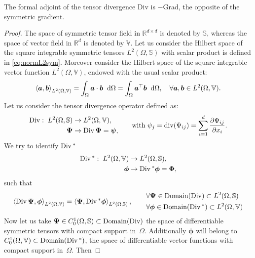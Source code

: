 \begin{theorem}\label{th:adjDiv}
	The formal adjoint of the tensor divergence $\mathrm{Div}$ is $- \mathrm{Grad}$, the opposite of the symmetric gradient.
	\begin{proof}
		The space of symmetric tensor field in $\mathbb{R}^{d\times d}$ is denoted by $\mathbb{S}$, whereas the space of vector field in $\mathbb{R}^{d}$ is denoted by $\mathbb{V}$. Let us consider the Hilbert space of the square integrable symmetric tensors $L^2(\Omega, \mathbb{S})$ with scalar product is defined in \eqref{eq:normL2sym}. Moreover consider the Hilbert space of the square integrable vector function $L^2(\Omega, \mathbb{V})$, endowed with the usual scalar product:
		\[
		\left\langle \bm{a} , \bm{b} \right\rangle_{L^2(\Omega, \mathbb{V})} = \int_{\Omega}  \bm{a} \cdot \bm{b} \; \d\Omega = \int_{\Omega} \bm{a}^\top \bm{b}\; \d\Omega, \quad \forall \bm{a}, \bm{b} \in L^2(\Omega, \mathbb{V}). \]
		Let us consider the tensor divergence operator defined as:
		\[
		\begin{aligned}
		\Div: \; L^2(\Omega, \mathbb{S})& \rightarrow L^2(\Omega, \mathbb{V}), \\
		\bm{\Psi}& \rightarrow \Div\bm{\Psi} = \bm{\psi}, \\
		\end{aligned}
		\qquad \text{with } \psi_j = \mathrm{div}(\Psi_{ij}) = \sum_{i = 1}^d \diffp{\Psi_{ij}}{x_i}.
		\]
		We try to identify $\operatorname*{Div}{}^*$
		\[
		\begin{aligned}
		\operatorname*{Div}{}^*: \; L^2(\Omega, \mathbb{V}) & \rightarrow L^2(\Omega, \mathbb{S}), \\
		\bm{\phi}& \rightarrow  \operatorname*{Div}{}^* \bm{\phi} = \bm{\Phi}, \\
		\end{aligned}
		\]
		such that \[
		\left\langle \operatorname*{Div} \bm{\Psi} , \bm{\phi} \right\rangle_{L^2(\Omega, \mathbb{V})} = \left\langle \bm{\Psi} , \operatorname*{Div}{}^* \bm{\phi} \right\rangle_{L^2(\Omega, \mathbb{S})},
		\begin{aligned} \qquad
		&\forall \bm{\Psi} \in \mathrm{Domain}(\operatorname*{Div}) \subset L^2(\Omega, \mathbb{S}) \\
		&\forall \bm{\phi} \in \mathrm{Domain}(\operatorname*{Div}{}^*) \subset L^2(\Omega, \mathbb{V})
		\end{aligned}
		\]
		Now let us take $\bm{\Psi} \in {C}_0^1(\Omega, \mathbb{S}) \subset \mathrm{Domain}(\operatorname*{Div})$ the space of differentiable symmetric tensors with compact support in~$\Omega$. Additionally $\bm{\phi}$ will belong to ${C}_0^1(\Omega, \mathbb{V}) \subset \mathrm{Domain}(\operatorname*{Div}{}^*)$, the space of differentiable vector functions with compact support in~$\Omega$. Then

\end{proof}
\end{theorem}
